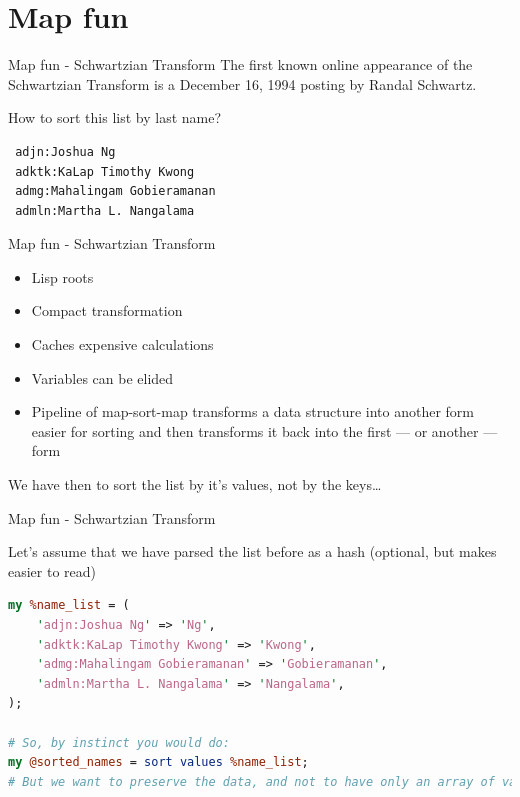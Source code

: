\documentclass[10pt]{beamer}
\begin{document}
 \section{Map fun}
 
 \begin{frame}[fragile]{Map fun - Schwartzian Transform}
The first known online appearance of the Schwartzian Transform is a December 16, 1994 posting by Randal Schwartz.

How to sort this list by last name?

\begin{lstlisting}
 adjn:Joshua Ng
 adktk:KaLap Timothy Kwong
 admg:Mahalingam Gobieramanan
 admln:Martha L. Nangalama
\end{lstlisting}


\end{frame}


 \begin{frame}[fragile]{Map fun - Schwartzian Transform}
 
 \begin{itemize}
     \item Lisp roots
     \item Compact transformation
     \item Caches expensive calculations
     \item Variables can be elided
     \item Pipeline of map-sort-map transforms a data structure into another form easier for sorting and then transforms it back into the first — or another — form 
 \end{itemize}
 
 We have then to sort the list by it's values, not by the keys\ldots
 \end{frame}


 \begin{frame}[fragile]{Map fun - Schwartzian Transform}
 
 Let's assume that we have parsed the list before as a hash (optional, but makes easier to read)
 
\begin{lstlisting}[language=perl]
my %name_list = (
    'adjn:Joshua Ng' => 'Ng',
    'adktk:KaLap Timothy Kwong' => 'Kwong',
    'admg:Mahalingam Gobieramanan' => 'Gobieramanan',
    'admln:Martha L. Nangalama' => 'Nangalama',
);

# So, by instinct you would do:
my @sorted_names = sort values %name_list;
# But we want to preserve the data, and not to have only an array of values.
\end{lstlisting}
 \end{frame}
\end{document}

